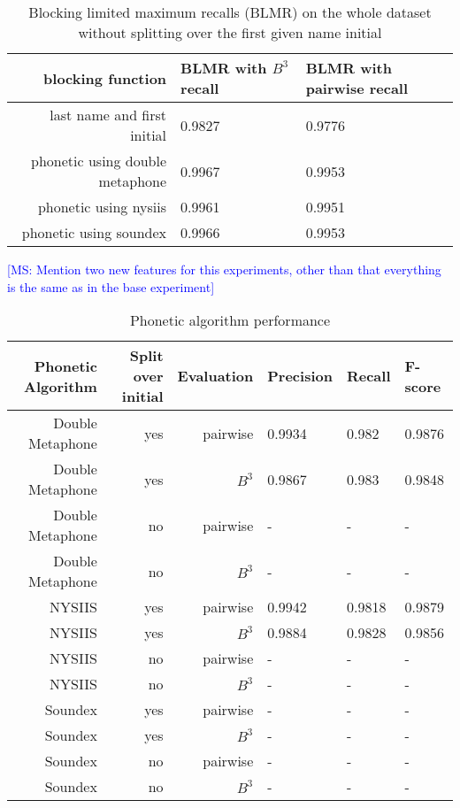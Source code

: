 \documentclass{article}
\newcommand{\msnote}[1]{\textcolor{blue}{[MS: #1]}}
\begin{document}
\begin{table}[H]
\caption{Blocking limited maximum recalls (BLMR) on the whole dataset without splitting over
the first given name initial}
\centering
\begin{tabular}{|r|l|l|}
  \hline
  blocking function & BLMR with $B^{3}$ recall & BLMR with pairwise recall \\
  \hline
  last name and first initial & 0.9827 & 0.9776 \\
  \hline
  phonetic using double metaphone & 0.9967 & 0.9953 \\
  \hline
  phonetic using nysiis & 0.9961 & 0.9951 \\
  \hline
  phonetic using soundex & 0.9966 & 0.9953 \\
  \hline
\end{tabular}
\end{table}

\msnote{Mention two new features for this experiments, other than that everything is the
same as in the base experiment}

\begin{table}[H]
\caption{Phonetic algorithm performance}
\centering
\begin{tabular}{|r|r|r|l|l|l|}
  \hline
  Phonetic Algorithm & Split over initial & Evaluation & Precision & Recall & F-score \\
  \hline
  Double Metaphone & yes & pairwise & 0.9934 & 0.982 & 0.9876 \\
  \hline
  Double Metaphone & yes & $B^3$ & 0.9867 & 0.983 & 0.9848 \\
  \hline
  Double Metaphone & no & pairwise & - & - & - \\
  \hline
  Double Metaphone & no & $B^3$ & - & - & - \\
  \hline
  NYSIIS & yes & pairwise & 0.9942 & 0.9818 & 0.9879 \\
  \hline
  NYSIIS & yes & $B^3$ & 0.9884 & 0.9828 & 0.9856 \\
  \hline
  NYSIIS & no & pairwise & - & - & - \\
  \hline
  NYSIIS & no & $B^3$ & - & - & - \\
  \hline
  Soundex & yes & pairwise & - & - & - \\
  \hline
  Soundex & yes & $B^3$ & - & - & - \\
  \hline
  Soundex & no & pairwise & - & - & - \\
  \hline
  Soundex & no & $B^3$ & - & - & - \\
  \hline
\end{tabular}
\end{table}
\end{document}
